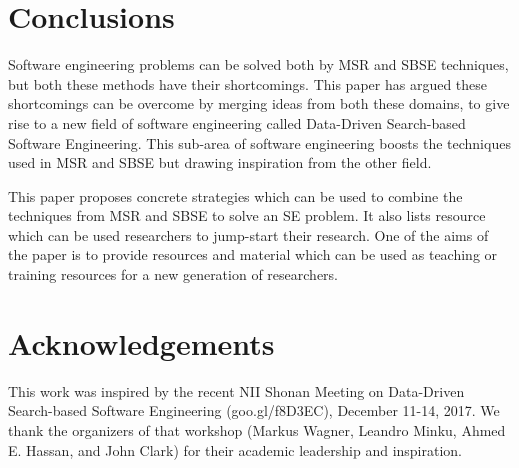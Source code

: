 \documentclass[sigconf,anonymous,review]{acmart}
\begin{document}
\section{Conclusions}
Software engineering problems can be solved both by MSR and SBSE techniques, but both these methods have their shortcomings. This paper has argued these shortcomings can be overcome by merging ideas from both these domains, to give rise to a new field of software engineering called Data-Driven Search-based Software Engineering. This sub-area of software engineering boosts the techniques used in MSR and SBSE but drawing inspiration from the other field. 

This paper proposes concrete strategies which can be used to combine the techniques from MSR and SBSE to solve an SE problem. It also lists resource which can be used researchers to jump-start their research. One of the aims of the paper is to provide resources and material which can be used as teaching or training resources for a new generation of researchers. 

% 
% 

\section*{Acknowledgements}
This work was inspired by the recent
 NII Shonan Meeting on Data-Driven Search-based Software Engineering (goo.gl/f8D3EC), December 11-14, 2017.
We thank the organizers of that workshop 
(Markus Wagner,  
 Leandro Minku,  
 Ahmed E. Hassan, and 
 John Clark)
for their academic
leadership and inspiration.

 

 
\end{document}
